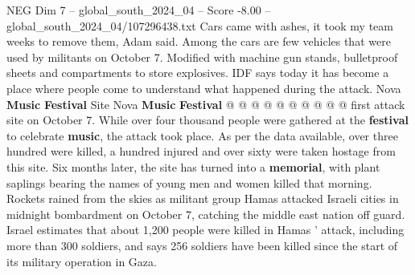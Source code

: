 \begin{textsample}{NEG Dim 7 – global\_south\_2024\_04 – Score -8.00 – global\_south\_2024\_04/107296438.txt}
Cars came with ashes, it took my team weeks to remove them, Adam said.
Among the cars are few vehicles that were used by militants on October 7.
Modified with machine gun stands, bulletproof sheets and compartments to store explosives.
IDF says today it has become a place where people come to understand what happened during the attack.
Nova \textbf{Music} \textbf{Festival} Site Nova \textbf{Music} \textbf{Festival} @ @ @ @ @ @ @ @ @ @ first attack site on October 7.
While over four thousand people were gathered at the \textbf{festival} to celebrate \textbf{music}, the attack took place.
As per the data available, over three hundred were killed, a hundred injured and over sixty were taken hostage from this site.
Six months later, the site has turned into a \textbf{memorial}, with plant saplings bearing the names of young men and women killed that morning.
Rockets rained from the skies as militant group Hamas attacked Israeli cities in midnight bombardment on October 7, catching the middle east nation off guard.
Israel estimates that about 1,200 people were killed in Hamas ' attack, including more than 300 soldiers, and says 256 soldiers have been killed since the start of its military operation in Gaza.

\end{textsample}
